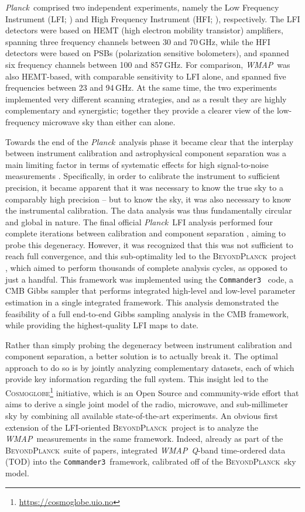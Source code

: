 \documentclass[twocolumn]{../../common/aa}
\def\WMAP{\emph{WMAP}}
\def\Planck{\emph{Planck}}
\def\commanderthree{\texttt{Commander3}}
\newcommand{\BP}{\textsc{BeyondPlanck}}
\newcommand{\cosmoglobe}{\textsc{Cosmoglobe}}
\newcommand{\Q}[0]{\textit Q}
\begin{document}
\Planck\ comprised two independent experiments, namely the Low Frequency Instrument (LFI; \citealp{planck2016-l02}) and High Frequency Instrument (HFI; \citealp{planck2016-l03}), respectively. The LFI detectors were based on HEMT (high electron mobility transistor) amplifiers, spanning three frequency channels between 30 and 70\,GHz, while the HFI detectors were based on PSBs (polarization sensitive bolometers), and spanned six frequency channels between 100 and 857\,GHz. For comparison, \WMAP\ was also HEMT-based, with comparable sensitivity to LFI alone, and spanned five frequencies between 23 and 94\,GHz. At the same time, the two experiments implemented very different scanning strategies, and as a result they are highly complementary and synergistic; together they provide a clearer view of the low-frequency microwave sky than either can alone.

Towards the end of the \Planck\ analysis phase it became clear that the interplay between instrument calibration and astrophysical component separation was a main limiting factor in terms of systematic effects for high signal-to-noise measurements \citep{planck2016-l02}. Specifically, in order to calibrate the instrument to sufficient precision, it became apparent that it was necessary to know the true sky to a comparably high precision -- but to know the sky, it was also necessary to know the instrumental calibration. The data analysis was thus fundamentally circular and global in nature. The final official \Planck\ LFI analysis performed four complete iterations between calibration and component separation \citep{planck2016-l02}, aiming to probe this degeneracy. However, it was recognized that this was not sufficient to reach full convergence, and this sub-optimality led to the \BP\ project \citep{bp01}, which aimed to perform thousands of complete analysis cycles, as opposed to just a handful. This framework was implemented using the \commanderthree\ \citep{bp03} code, a CMB Gibbs sampler that performs integrated high-level and low-level parameter estimation in a single integrated framework. This analysis demonstrated the feasibility of a full end-to-end Gibbs sampling analysis in the CMB framework, while providing the highest-quality LFI maps to date.

Rather than simply probing the degeneracy between instrument calibration and component separation, a better solution is to actually break it. The optimal approach to do so is by jointly analyzing complementary datasets, each of which provide key information regarding the full system. This insight led to the \cosmoglobe\footnote{\url{https://cosmoglobe.uio.no}} initiative, which is an Open Source and community-wide effort that aims to derive a single joint model of the radio, microwave, and sub-millimeter sky by combining all available state-of-the-art experiments. An obvious first extension of the LFI-oriented \BP\ project is to analyze the \WMAP\ measurements in the same framework. Indeed, already as part of the \BP\ suite of papers, \citet{bp17} integrated \WMAP\ \Q-band time-ordered data (TOD) into the \commanderthree\ framework, calibrated off of the \BP\ sky model.
\end{document}
